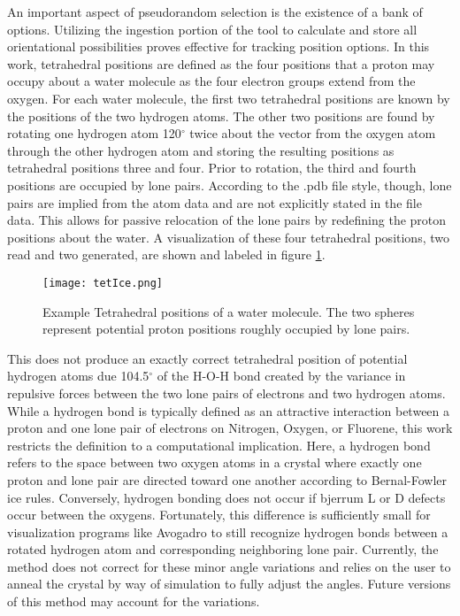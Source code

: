 An important aspect of pseudorandom selection is the existence of a bank of options.
Utilizing the ingestion portion of the tool to calculate and store all orientational possibilities proves effective for tracking position options.
In this work, tetrahedral positions are defined as the four positions that a proton may occupy about a water molecule as the four electron groups extend from the oxygen.
For each water molecule, the first two tetrahedral positions are known by the positions of the two hydrogen atoms. 
The other two positions are found by rotating one hydrogen atom 120$^{\circ}$ twice about the vector from the oxygen atom through the other hydrogen atom and storing the resulting positions as tetrahedral positions three and four. 
Prior to rotation, the third and fourth positions are occupied by lone pairs.
According to the .pdb file style, though, lone pairs are implied from the atom data and are not explicitly stated in the file data.
This allows for passive relocation of the lone pairs by redefining the proton positions about the water.
A visualization of these four tetrahedral positions, two read and two generated, are shown and labeled in figure \ref{fig:tetXI}.

\begin{figure}
	
	\centering
	
	\texttt{[image: tetIce.png]}
	
	\caption{Example Tetrahedral positions of a water molecule. The two spheres represent potential proton positions roughly occupied by lone pairs.}
	
	\label{fig:tetXI}
	
\end{figure}

This does not produce an exactly correct tetrahedral position of potential hydrogen atoms due 104.5$^{\circ}$ of the H-O-H bond created by the variance in repulsive forces between the two lone pairs of electrons and two hydrogen atoms. 
While a hydrogen bond is typically defined as an attractive interaction between a proton and one lone pair of electrons on Nitrogen, Oxygen, or Fluorene, this work restricts the definition to a computational implication.
Here, a hydrogen bond refers to the space between two oxygen atoms in a crystal where exactly one proton and lone pair are directed toward one another according to Bernal-Fowler ice rules. 
Conversely, hydrogen bonding does not occur if bjerrum L or D defects occur between the oxygens.
Fortunately, this difference is sufficiently small for visualization programs like Avogadro to still recognize hydrogen bonds between a rotated hydrogen atom and corresponding neighboring lone pair. 
Currently, the method does not correct for these minor angle variations and relies on the user to anneal the crystal by way of simulation to fully adjust the angles. 
Future versions of this method may account for the variations.

